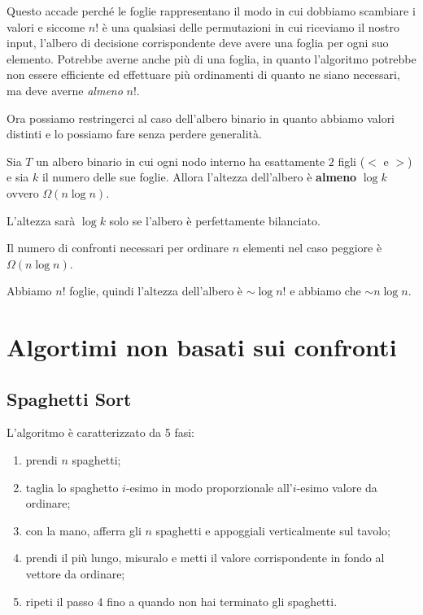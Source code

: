 Questo accade perché le foglie rappresentano il modo in cui dobbiamo scambiare i valori e siccome \(n!\) è una qualsiasi delle permutazioni in cui riceviamo il nostro input, l'albero di decisione corrispondente deve avere una foglia per ogni suo elemento.
Potrebbe averne anche più di una foglia, in quanto l'algoritmo potrebbe non essere efficiente ed effettuare più ordinamenti di quanto ne siano necessari, ma deve averne \emph{almeno} \(n!\).

Ora possiamo restringerci al caso dell'albero binario in quanto abbiamo valori distinti e lo possiamo fare senza perdere generalità.

\begin{lemma}
Sia \(T\) un albero binario in cui ogni nodo interno ha esattamente \(2\) figli (\(<\) e \(>\)) e sia \(k\) il numero delle sue foglie.
Allora l'altezza dell'albero è \textbf{almeno} \(\log k\) ovvero \(\Omega(n \log n)\).
\end{lemma}

L'altezza sarà \(\log k\) solo se l'albero è perfettamente bilanciato.

\begin{theorem}
Il numero di confronti necessari per ordinare \(n\) elementi nel caso peggiore è \(\Omega(n \log n)\).
\end{theorem}

Abbiamo \(n!\) foglie, quindi l'altezza dell'albero è \(\sim \log n!\) e abbiamo che \(\sim n \log n\).

\section{Algortimi non basati sui confronti}

\subsection{Spaghetti Sort}

L'algoritmo \spaghettiSort è caratterizzato da 5 fasi:
\begin{enumerate}
    \item prendi \(n\) spaghetti;
    \item taglia lo spaghetto \(i\)-esimo in modo proporzionale all'\(i\)-esimo valore da ordinare;
    \item con la mano, afferra gli \(n\) spaghetti e appoggiali verticalmente sul tavolo;
    \item prendi il più lungo, misuralo e metti il valore corrispondente in fondo al vettore da ordinare;
    \item ripeti il passo 4 fino a quando non hai terminato gli spaghetti.
\end{enumerate}

